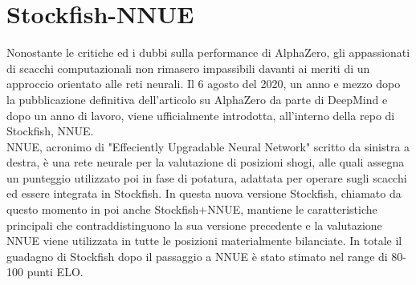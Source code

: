 \section{Stockfish-NNUE}
Nonostante le critiche ed i dubbi sulla performance di AlphaZero, gli appassionati di scacchi computazionali non rimasero impassibili davanti ai meriti di un approccio orientato alle reti neurali.
Il 6 agosto del 2020, un anno e mezzo dopo la pubblicazione definitiva dell'articolo su AlphaZero da parte di DeepMind e dopo un anno di lavoro, viene ufficialmente introdotta, all'interno della repo di Stockfish, NNUE.
\\NNUE, acronimo di "Effeciently Upgradable Neural Network" scritto da sinistra a destra, è una rete neurale per la valutazione di posizioni shogi, alle quali assegna un punteggio
utilizzato poi in fase di potatura, adattata per operare sugli scacchi ed essere integrata in Stockfish.
In questa nuova versione Stockfish, chiamato da questo momento in poi anche Stockfish+NNUE, mantiene le caratteristiche principali che contraddistinguono la sua versione precedente e la valutazione NNUE viene
utilizzata in tutte le posizioni materialmente bilanciate. In totale il guadagno di Stockfish dopo il passaggio a NNUE è stato stimato nel range di 80-100 punti ELO.

